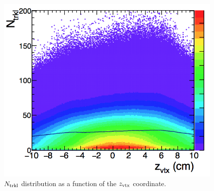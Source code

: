 \begin{figure}[h]
\centering
 \includegraphics[width=.6\textwidth]{FigCap6/NtrklVsVxtZ_Data.png}
 \caption{$N_{\rm trkl}$ distribution as a function of the $z_{\rm vtx}$ coordinate.}
 \label{fig:NtrklVsZ2D}
\end{figure}


